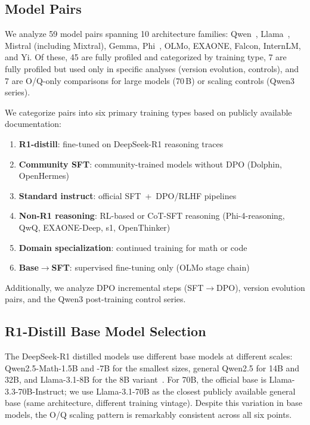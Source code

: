 \documentclass[11pt]{article}
\begin{document}
\subsection{Model Pairs}

We analyze 59 model pairs spanning 10 architecture families:
Qwen~\citep{qwen25, qwen3}, Llama~\citep{llama3}, Mistral (including Mixtral),
Gemma, Phi~\citep{phi4}, OLMo, EXAONE, Falcon, InternLM, and Yi.
Of these, 45 are fully profiled and categorized by training type,
7 are fully profiled but used only in specific analyses (version evolution,
controls), and 7 are O/Q-only comparisons for large models (70\,B) or scaling
controls (Qwen3 series).

We categorize pairs into six primary training types based on publicly available
documentation:
\begin{enumerate}[nosep]
  \item \textbf{R1-distill}: fine-tuned on DeepSeek-R1 reasoning traces~\citep{deepseek-r1}
  \item \textbf{Community SFT}: community-trained models without DPO (Dolphin, OpenHermes)
  \item \textbf{Standard instruct}: official SFT~+~DPO/RLHF pipelines
  \item \textbf{Non-R1 reasoning}: RL-based or CoT-SFT reasoning (Phi-4-reasoning,
    QwQ, EXAONE-Deep, s1, OpenThinker)
  \item \textbf{Domain specialization}: continued training for math or code
  \item \textbf{Base$\to$SFT}: supervised fine-tuning only (OLMo stage chain)
\end{enumerate}

Additionally, we analyze DPO incremental steps (SFT$\to$DPO), version evolution
pairs, and the Qwen3 post-training control series.

\subsection{R1-Distill Base Model Selection}

The DeepSeek-R1 distilled models use different base models at different scales:
Qwen2.5-Math-1.5B and -7B for the smallest sizes, general Qwen2.5 for 14B and
32B, and Llama-3.1-8B for the 8B variant~\citep{deepseek-r1}.
For 70B, the official base is Llama-3.3-70B-Instruct; we use Llama-3.1-70B as
the closest publicly available general base (same architecture, different
training vintage).
Despite this variation in base models, the O/Q scaling pattern is remarkably
consistent across all six points.
\end{document}
